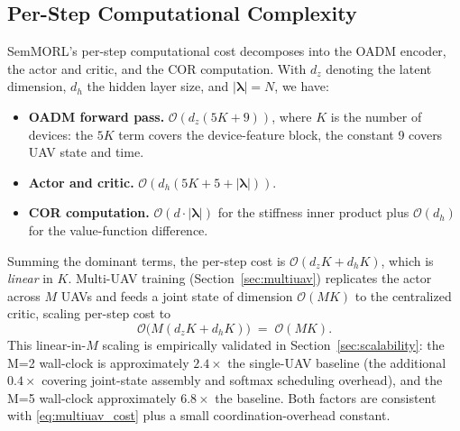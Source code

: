 \subsection{Per-Step Computational Complexity}
\label{ssec:complexity}

SemMORL's per-step computational cost decomposes into the OADM
encoder, the actor and critic, and the COR computation. With
$d_z$ denoting the latent dimension, $d_h$ the hidden layer size,
and $|\bm{\lambda}|=N$, we have:

\begin{itemize}
\item \textbf{OADM forward pass.} $\mathcal{O}(d_z(5K+9))$, where $K$
      is the number of devices: the $5K$ term covers the device-feature
      block, the constant 9 covers UAV state and time.
\item \textbf{Actor and critic.} $\mathcal{O}(d_h(5K+5+|\bm{\lambda}|))$.
\item \textbf{COR computation.} $\mathcal{O}(d\cdot|\bm{\lambda}|)$ for
      the stiffness inner product plus $\mathcal{O}(d_h)$ for the
      value-function difference.
\end{itemize}

Summing the dominant terms, the per-step cost is
$\mathcal{O}(d_z K + d_h K)$, which is \emph{linear} in $K$. Multi-UAV
training (Section~\ref{sec:multiuav}) replicates the actor across
$M$ UAVs and feeds a joint state of dimension
$\mathcal{O}(MK)$ to the centralized critic, scaling per-step cost to
\begin{equation}
\label{eq:multiuav_cost}
\mathcal{O}\!\big(M(d_z K + d_h K)\big) \;=\; \mathcal{O}(MK).
\end{equation}
This linear-in-$M$ scaling is empirically validated in
Section~\ref{sec:scalability}: the M=2 wall-clock is approximately
$2.4\times$ the single-UAV baseline (the additional $0.4\times$
covering joint-state assembly and softmax scheduling overhead), and
the M=5 wall-clock approximately $6.8\times$ the baseline. Both
factors are consistent with \eqref{eq:multiuav_cost} plus a small
coordination-overhead constant.

